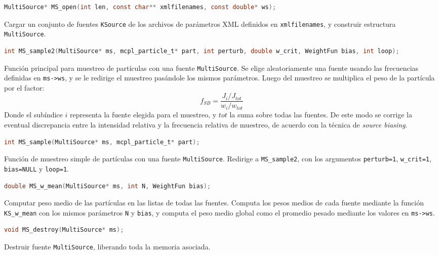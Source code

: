 \begin{footnotesize}
\begin{lstlisting}[language=C]
MultiSource* MS_open(int len, const char** xmlfilenames, const double* ws);
\end{lstlisting}
\begin{addmargin}[0.5cm]{0cm}
Cargar un conjunto de fuentes \verb|KSource| de los archivos de parámetros XML definidos en \verb|xmlfilenames|, y construir estructura \verb|MultiSource|.
\end{addmargin}

\begin{lstlisting}[language=C]
int MS_sample2(MultiSource* ms, mcpl_particle_t* part, int perturb, double w_crit, WeightFun bias, int loop);
\end{lstlisting}
\begin{addmargin}[0.5cm]{0cm}
Función principal para muestreo de partículas con una fuente \verb|MultiSource|. Se elige aleatoriamente una fuente usando las frecuencias definidas en \verb|ms->ws|, y se le redirige el muestreo pasándole los mismos parámetros. Luego del muestreo se multiplica el peso de la partícula por el factor:
\begin{equation}
	f_{SB} = \frac{J_i / J_{tot}}{w_i / w_{tot}}
\end{equation}
Donde el subíndice $i$ representa la fuente elegida para el muestreo, y $tot$ la suma sobre todas las fuentes. De este modo se corrige la eventual discrepancia entre la intensidad relativa y la frecuencia relativa de muestreo, de acuerdo con la técnica de \emph{source biasing}.
\end{addmargin}

\begin{lstlisting}[language=C]
int MS_sample(MultiSource* ms, mcpl_particle_t* part);
\end{lstlisting}
\begin{addmargin}[0.5cm]{0cm}
Función de muestreo simple de partículas con una fuente \verb|MultiSource|. Redirige a \verb|MS_sample2|, con los argumentos \verb|perturb=1|, \verb|w_crit=1|, \verb|bias=NULL| y \verb|loop=1|.
\end{addmargin}

\begin{lstlisting}[language=C]
double MS_w_mean(MultiSource* ms, int N, WeightFun bias);
\end{lstlisting}
\begin{addmargin}[0.5cm]{0cm}
Computar peso medio de las partículas en las listas de todas las fuentes. Computa los pesos medios de cada fuente mediante la función \verb|KS_w_mean| con los mismos parámetros \verb|N| y \verb|bias|, y computa el peso medio global como el promedio pesado mediante los valores en \verb|ms->ws|.
\end{addmargin}

\begin{lstlisting}[language=C]
void MS_destroy(MultiSource* ms);
\end{lstlisting}
\begin{addmargin}[0.5cm]{0cm}
Destruir fuente \verb|MultiSource|, liberando toda la memoria asociada.
\end{addmargin}

\end{footnotesize}


